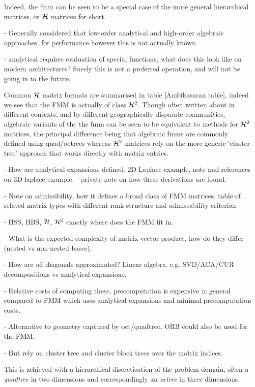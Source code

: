Indeed, the \acrshort{fmm} can be seen to be a special case of the more general hierarchical matrices, or $\mathcal{H}$ matrices for short.

- Generally considered that low-order analytical and high-order algebraic approaches, for performance however this is not actually known.

- analytical requires evaluation of special functions, what does this look like on modern architectures? Surely this is not a preferred operation, and will not be going in to the future.

Common $\mathcal{H}$ matrix formats are summarised in table [Ambikasaran table], indeed we see that the FMM is actually of class $\mathcal{H}^2$. Though often written about in different contexts, and by different geographically disparate communities, algebraic variants of the the \acrshort{fmm} can be seen to be equivalent to methods for $\mathcal{H}^2$ matrices, the principal difference being that algebraic \glspl{fmm} are commonly defined using quad/octrees whereas $\mathcal{H}^2$ matrices rely on the more generic `cluster tree' approach that works directly with matrix entries.

- How are analytical expansions defined, 2D Laplace example, note and references on 3D laplace example.
    - private note on how these derivations are found.

- Note on admissibility, how it defines a broad class of FMM matrices, table of related matrix types with different rank structure and admissability criterion

- HSS, HBS, $\mathcal{H}$, $\mathcal{H}^2$ exactly where does the FMM fit in.

- What is the expected complexity of matrix vector product, how do they differ (nested vs non-nested bases).

- How are off diagonals approximated? Linear algebra. e.g. SVD/ACA/CUR decompositions vs analytical expansions.

- Relative costs of computing these, precomputation is expensive in general compared to FMM which uses analytical expansions and minimal precomputation costs.

- Alternative to geometry captured by oct/quadtree. ORB could also be used for the FMM.

- But rely on cluster tree and cluster block trees over the matrix indices.

This is achieved with a hierarchical discretisation of the problem domain, often a \textit{quadtree} in two dimensions and correspondingly an \textit{octree} in three dimensions.

